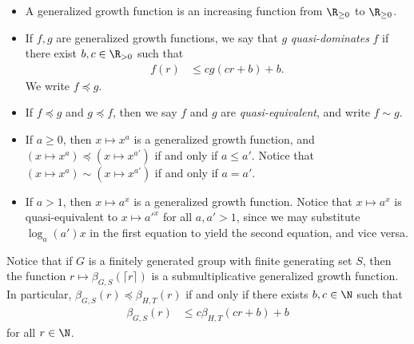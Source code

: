 \documentclass[10pt]{mypackage}
\begin{document}
\begin{definition}\hfill
  \begin{itemize}
    \item A generalized growth function is an increasing function from $\R_{\geq 0}$ to $\R_{\geq 0}$.
    \item If $f,g$ are generalized growth functions, we say that $g$ \textit{quasi-dominates} $f$ if there exist $b,c\in \R_{> 0}$ such that
      \begin{align*}
        f(r) &\leq cg\left( cr + b \right) + b.
      \end{align*}
      We write $f\preceq g$.
    \item If $f\preceq g$ and $g\preceq f$, then we say $f$ and $g$ are \textit{quasi-equivalent}, and write $f\sim g$.
  \end{itemize}
\end{definition}
\begin{example}\hfill
  \begin{itemize}
    \item If $a \geq 0$, then $x\mapsto x^{a}$ is a generalized growth function, and $\left( x\mapsto x^{a} \right)\preceq \left( x\mapsto x^{a'} \right)$ if and only if $a\leq a'$. Notice that $\left( x\mapsto x^{a} \right) \sim \left( x\mapsto x^{a'} \right)$ if and only if $a = a'$.
    \item If $a > 1$, then $x\mapsto a^{x}$ is a generalized growth function. Notice that $x\mapsto a^{x}$ is quasi-equivalent to $x\mapsto a'^{x}$ for all $a,a' > 1$, since we may substitute $\log_{a}(a')x$ in the first equation to yield the second equation, and vice versa.
  \end{itemize}
\end{example}
Notice that if $G$ is a finitely generated group with finite generating set $S$, then the function $r\mapsto \beta_{G,S}\left( \lceil r \rceil \right)$ is a submultiplicative generalized growth function. In particular, $\beta_{G,S}\left( r \right)\preceq \beta_{H,T}\left( r \right)$ if and only if there exists $b,c\in \N$ such that
\begin{align*}
  \beta_{G,S}\left( r \right) &\leq c\beta_{H,T}\left( cr + b \right) + b
\end{align*}
for all $r\in \N$.
\end{document}
